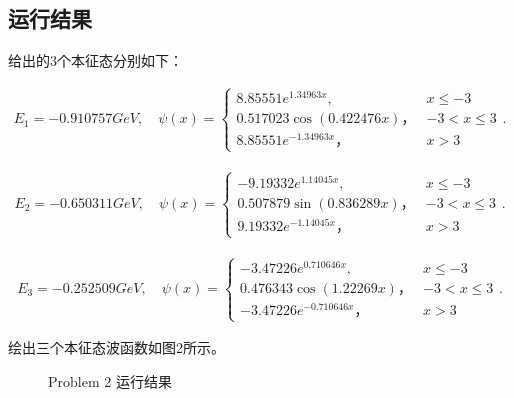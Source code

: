 \documentclass{article}
\begin{document}
\subsection{运行结果}

给出的3个本征态分别如下：

\begin{equation}
\begin{aligned}
		E_1=-0.910757GeV,\quad
		\psi(x)
			=\left\{
		\begin{array}{lr}
		8.85551 e^{1.34963 x}, & x\le -3\\
		 0.517023 \cos (0.422476 x)，& -3<x\le 3\\
			 8.85551 e^{-1.34963 x}，& x>3
		\end{array}.
	\right.
	\end{aligned}
\end{equation}

\begin{equation}
\begin{aligned}
		E_2=-0.650311GeV,\quad
		\psi(x)
			=\left\{
		\begin{array}{lr}
		-9.19332 e^{1.14045 x}, & x\le -3\\
		 0.507879 \sin (0.836289 x)，& -3<x\le 3\\
			9.19332 e^{-1.14045 x}，& x>3
		\end{array}.
	\right.
	\end{aligned}
\end{equation}

\begin{equation}
\begin{aligned}
		E_3=-0.252509GeV,\quad
		\psi(x)
			=\left\{
		\begin{array}{lr}
		-3.47226 e^{0.710646 x}, & x\le -3\\
		0.476343 \cos (1.22269 x)，& -3<x\le 3\\
			-3.47226 e^{-0.710646 x}，& x>3
		\end{array}.
	\right.
	\end{aligned}
\end{equation}

绘出三个本征态波函数如图2所示。

\begin{figure}[tbp]
 \caption{Problem 2 运行结果}
\end{figure}
\end{document}
